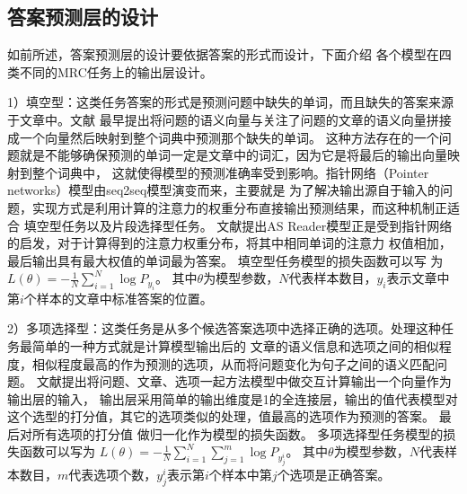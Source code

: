\subsection{答案预测层的设计}\label{output}
如前所述，答案预测层的设计要依据答案的形式而设计，下面介绍
各个模型在四类不同的MRC任务上的输出层设计。

1）填空型：这类任务答案的形式是预测问题中缺失的单词，而且缺失的答案来源于文章中。文献\cite{Hermann}
最早提出将问题的语义向量与关注了问题的文章的语义向量拼接成一个向量然后映射到整个词典中预测那个缺失的单词。
这种方法存在的一个问题就是不能够确保预测的单词一定是文章中的词汇，因为它是将最后的输出向量映射到整个词典中，
这就使得模型的预测准确率受到影响。指针网络（Pointer networks）模型由seq2seq模型演变而来，主要就是
为了解决输出源自于输入的问题，实现方式是利用计算的注意力的权重分布直接输出预测结果，而这种机制正适合
填空型任务以及片段选择型任务。
文献\cite{ASR}提出AS Reader模型正是受到指针网络的启发，对于计算得到的注意力权重分布，将其中相同单词的注意力
权值相加，最后输出具有最大权值的单词最为答案。
填空型任务模型的损失函数可以写
为$L(\theta)=-\displaystyle\frac{1}{N}\sum_{i=1}^{N}\log P_{y_i}$。
其中$\theta$为模型参数，$N$代表样本数目，$y_i$表示文章中第$i$个样本的文章中标准答案的位置。

2）多项选择型：这类任务是从多个候选答案选项中选择正确的选项。处理这种任务最简单的一种方式就是计算模型输出后的
文章的语义信息和选项之间的相似程度，相似程度最高的作为预测的选项，从而将问题变化为句子之间的语义匹配问题。
文献\cite{Co-matching}提出将问题、文章、选项一起方法模型中做交互计算输出一个向量作为输出层的输入，
输出层采用简单的输出维度是1的全连接层，输出的值代表模型对这个选型的打分值，其它的选项类似的处理，值最高的选项作为预测的答案。
最后对所有选项的打分值
做归一化作为模型的损失函数。
多项选择型任务模型的损失函数可以写为
$L(\theta)=-\displaystyle\frac{1}{N}\sum_{i=1}^{N}\sum_{j=1}^{m}\log P_{y_{j}^i}$。
其中$\theta$为模型参数，$N$代表样本数目，$m$代表选项个数，$y_{j}^i$表示第$i$个样本中第$j$个选项是正确答案。

